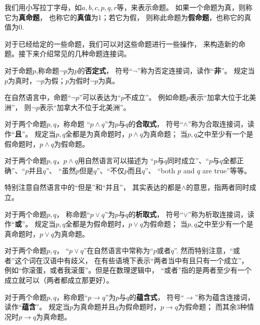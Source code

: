 我们用小写拉丁字母，如$a,b,c,p,q,r$等，来表示命题。
如果一个命题为真，则称它为\textbf{真命题}，
也称它的\textbf{真值}为1；若它为假，
则称此命题为\textbf{假命题}，也称它的真值为0.\vsp

对于已经给定的一些命题，我们可以对这些命题进行一些操作，
来构造新的命题。接下来介绍常见的几种命题连接词。


\begin{definition}[否定连接词]
对于命题$p$,称命题$\neg p$为$p$的\textbf{否定式}，
符号“$\neg$”称为否定连接词，读作“\textbf{非}”。
规定当$p$为真时，$\neg p$为假；$p$为假时$\neg p$为真。
\end{definition}

在自然语言中，命题“$\neg p$”可以表达为“$p$不成立”。
例如命题$p$表示“加拿大位于北美洲”，
则$\neg p$表示“加拿大不位于北美洲”。

\begin{definition}[合取连接词]
对于两个命题$p,q$，称命题
“$p\wedge q$”为$p$与$q$的\textbf{合取式}，
符号“$\wedge$”称为合取连接词，读作“\textbf{且}”。
规定当$p,q$全都是为真命题时，$p\wedge q$为真命题；
当$p,q$之中至少有一个是假命题时，$p\wedge q$为假命题。
\end{definition}
对于两个命题$p,q$，$p\wedge q$用自然语言可以描述为
“$p$与$q$同时成立”、“$p$与$q$全都正确”、“$p$并且$q$”、
“虽然$p$但是$q$”、“不仅$p$而且$q$”、
“both $p$ and $q$ are true”等等。

特别注意自然语言中的“但是”和“并且”，
其实表达的都是$\wedge$的意思，指两者同时成立。

\begin{definition}[析取连接词]
对于两个命题$p,q$，
称命题“$p\vee q$”为$p$与$q$的\textbf{析取式}，
符号“$\vee$”称为析取连接词，读作“\textbf{或}”。
规定当$p,q$全都是为假命题时，$p\vee q$为假命题；
当$p,q$之中至少有一个是真命题时，$p\vee q$为真命题。
\end{definition}
对于两个命题$p,q$，
“$p\vee q$”在自然语言中常称为“$p$或者$q$”.
然而特别注意，“或者”这个词在汉语中有歧义，
在有些语境下表示“两者当中有且只有一个成立”，
例如“你滚蛋，或者我滚蛋”。但是在数理逻辑中，
“或者”指的是两者至少有一个成立就可以（两者都成立那更好）。

\begin{definition}[蕴含连接词]
对于两个命题$p,q$，称命题“$p\rightarrow q$”为$p$与$q$的\textbf{蕴含式}，
符号“$\rightarrow$”称为蕴含连接词，读作“\textbf{蕴含}”。
规定当$p$为真命题并且$q$为假命题时，$p\rightarrow q$为假命题；
而其余3种情况时$p\rightarrow q$为真命题。
\end{definition}

